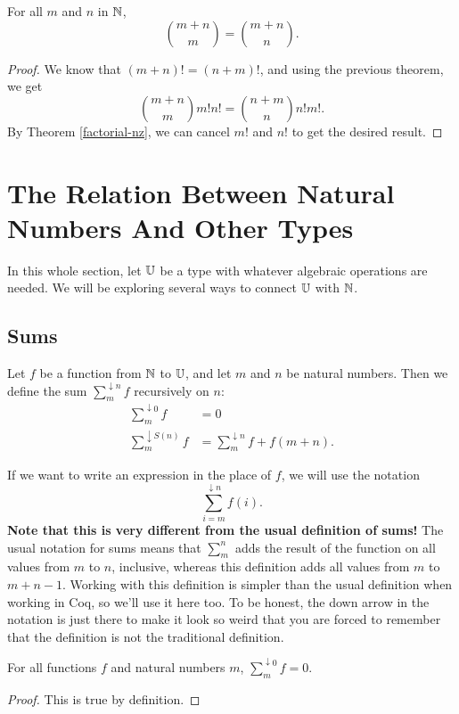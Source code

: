 \documentclass[../math.tex]{subfiles}
\begin{document}
\begin{theorem}
    For all $m$ and $n$ in $\mathbb{N}$,
    \[
        \binom{m + n}{m} = \binom{m + n}{n}.
    \]
\end{theorem}
\begin{proof}
    We know that $(m + n)! = (n + m)!$, and using the previous theorem, we get
    \[
        \binom{m + n}{m} m! n! = \binom{n + m}{n} n! m!.
    \]
    By Theorem \ref{factorial-nz}, we can cancel $m!$ and $n!$ to get the
    desired result.
\end{proof}

\section{The Relation Between Natural Numbers And Other Types}

In this whole section, let $\mathbb{U}$ be a type with whatever algebraic operations are
needed.  We will be exploring several ways to connect $\mathbb{U}$ with $\mathbb{N}$.

\subsection{Sums}

\begin{definition}
    Let $f$ be a function from $\mathbb{N}$ to $\mathbb{U}$, and let $m$ and $n$ be natural
    numbers.  Then we define the sum $\sum_m^{\downarrow n} f$ recursively on
    $n$:
    \begin{align*}
        \sum_m^{\downarrow 0}    f &= 0 \\
        \sum_m^{\downarrow S(n)} f &= \sum_m^{\downarrow n} f + f(m + n).
    \end{align*}
\end{definition}
If we want to write an expression in the place of $f$, we will use the notation
\[
    \sum_{i = m}^{\downarrow n} f(i).
\]
\textbf{Note that this is very different from the usual definition of sums!} The
usual notation for sums means that $\sum_m^n$ adds the result of the function on
all values from $m$ to $n$, inclusive, whereas this definition adds all values
from $m$ to $m + n - 1$.  Working with this definition is simpler than the usual
definition when working in Coq, so we'll use it here too.  To be honest, the
down arrow in the notation is just there to make it look so weird that you are
forced to remember that the definition is not the traditional definition.

\begin{theorem}
    For all functions $f$ and natural numbers $m$, $\sum_m^{\downarrow 0} f =
    0$.
\end{theorem}
\begin{proof}
    This is true by definition.
\end{proof}
\end{document}
